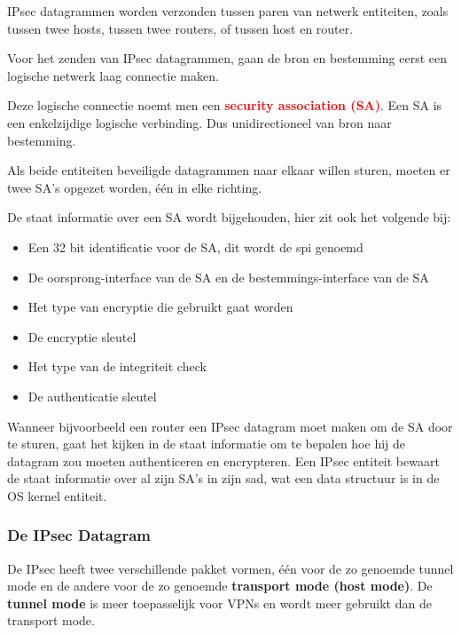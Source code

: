 \noindent IPsec datagrammen worden verzonden tussen paren van netwerk entiteiten, zoals tussen twee hosts, tussen twee routers, of tussen host en router.

\noindent Voor het zenden van IPsec datagrammen, gaan de bron en bestemming eerst een logische netwerk laag connectie maken.

\noindent Deze logische connectie noemt men een \textcolor{red}{\textbf{security association (SA)}}. Een SA is een enkelzijdige logische verbinding. Dus unidirectioneel van bron naar bestemming.

\noindent Als beide entiteiten beveiligde datagrammen naar elkaar willen sturen, moeten er twee SA’s opgezet worden, één in elke richting.

\noindent De staat informatie over een SA wordt bijgehouden, hier zit ook het volgende bij:
\begin{itemize}
\item Een 32 bit identificatie voor de SA, dit wordt de \acrfull{spi} genoemd
\item De oorsprong-interface van de SA en de bestemmings-interface van de SA
\item Het type van encryptie die gebruikt gaat worden
\item De encryptie sleutel
\item Het type van de integriteit check
\item De authenticatie sleutel
\end{itemize}

\noindent Wanneer bijvoorbeeld een router een IPsec datagram moet maken om de SA door te sturen, gaat het kijken in de staat informatie om te bepalen hoe hij de datagram zou moeten authenticeren en encrypteren.
Een IPsec entiteit bewaart de staat informatie over al zijn SA’s in zijn \acrfull{sad}, wat een data structuur is in de OS kernel entiteit.



\subsubsection{De IPsec Datagram}

De IPsec heeft twee verschillende pakket vormen, één voor de zo genoemde tunnel mode en de andere voor de zo genoemde \textbf{transport mode (host mode)}. De \textbf{tunnel mode} is meer toepasselijk voor VPNs en wordt meer gebruikt dan de transport mode.

